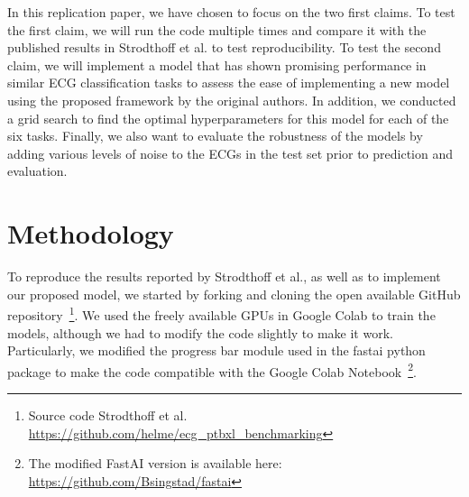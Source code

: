 In this replication paper, we have chosen to focus on the two first claims. To test the first claim, we will run the code multiple times and compare it with the published results in Strodthoff et al. to test reproducibility. To test the second claim, we will implement a model that has shown promising performance in similar ECG classification tasks to assess the ease of implementing a new model using the proposed framework by the original authors. In addition, we conducted a grid search to find the optimal hyperparameters for this model for each of the six tasks. Finally, we also want to evaluate the robustness of the models by adding various levels of noise to the ECGs in the test set prior to prediction and evaluation.



\section{Methodology}

To reproduce the results reported by Strodthoff et al., as well as to implement our proposed model, we started by forking and cloning the open available GitHub repository~\footnote{Source code Strodthoff et al. \url{https://github.com/helme/ecg\_ptbxl\_benchmarking}}. We used the freely available GPUs in Google Colab to train the models, although we had to modify the code slightly to make it work. Particularly, we modified the progress bar module used in the fastai python package to make the code compatible with the Google Colab Notebook~\footnote{The modified FastAI version is available here: \url{https://github.com/Bsingstad/fastai}}.

